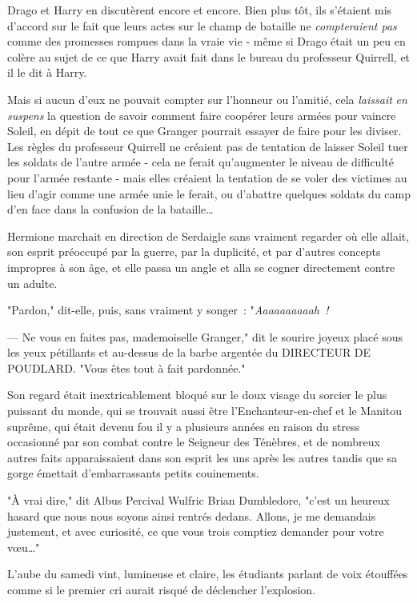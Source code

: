 Drago et Harry en discutèrent encore et encore. Bien plus tôt, ils s'étaient mis d'accord sur le fait que leurs actes sur le champ de bataille ne \emph{compteraient pas} comme des promesses rompues dans la vraie vie - même si Drago était un peu en colère au sujet de ce que Harry avait fait dans le bureau du professeur Quirrell, et il le dit à Harry.

Mais si aucun d'eux ne pouvait compter sur l'honneur ou l'amitié, cela \emph{laissait} \emph{en suspens} la question de savoir comment faire coopérer leurs armées pour vaincre Soleil, en dépit de tout ce que Granger pourrait essayer de faire pour les diviser. Les règles du professeur Quirrell ne créaient pas de tentation de laisser Soleil tuer les soldats de l'autre armée - cela ne ferait qu'augmenter le niveau de difficulté pour l'armée restante - mais elles créaient la tentation de se voler des victimes au lieu d'agir comme une armée unie le ferait, ou d'abattre quelques soldats du camp d'en face dans la confusion de la bataille…

\later

Hermione marchait en direction de Serdaigle sans vraiment regarder où elle allait, son esprit préoccupé par la guerre, par la duplicité, et par d'autres concepts impropres à son âge, et elle passa un angle et alla se cogner directement contre un adulte.

"Pardon," dit-elle, puis, sans vraiment y songer~: "\emph{Aaaaaaaaaah~!}

--- Ne vous en faites pas, mademoiselle Granger," dit le sourire joyeux placé sous les yeux pétillants et au-dessus de la barbe argentée du DIRECTEUR DE POUDLARD. "Vous êtes tout à fait pardonnée."

Son regard était inextricablement bloqué sur le doux visage du sorcier le plus puissant du monde, qui se trouvait aussi être l'Enchanteur-en-chef et le Manitou suprême, qui était devenu fou il y a plusieurs années en raison du stress occasionné par son combat contre le Seigneur des Ténèbres, et de nombreux autres faits apparaissaient dans son esprit les uns après les autres tandis que sa gorge émettait d'embarrassants petits couinements.

"À vrai dire," dit Albus Percival Wulfric Brian Dumbledore, "c'est un heureux hasard que nous nous soyons ainsi rentrés dedans. Allons, je me demandais justement, et avec curiosité, ce que vous trois comptiez demander pour votre vœu…"

\later

L'aube du samedi vint, lumineuse et claire, les étudiants parlant de voix étouffées comme si le premier cri aurait risqué de déclencher l'explosion.

